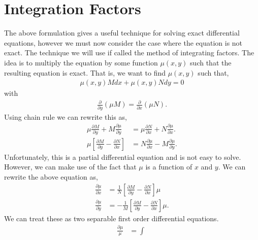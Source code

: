 \section{Integration Factors}
\noindent The above formulation gives a useful technique for solving exact differential equations, however we must now consider the case where the equation is not exact.
The technique we will use if called the method of integrating factors.
The idea is to multiply the equation by some function $\mu(x,y)$ such that the resulting equation is exact.
That is, we want to find $\mu(x,y)$ such that,
\begin{align*}
    \mu(x,y)Mdx + \mu(x,y)Ndy = 0
\end{align*}
with
\begin{align*}
    \frac{\partial}{\partial y}(\mu M) = \frac{\partial}{\partial x}(\mu N).
\end{align*}
Using chain rule we can rewrite this as,
\begin{align*}
    \mu \frac{\partial M}{\partial y} + M \frac{\partial \mu}{\partial y} &= \mu \frac{\partial N}{\partial x} + N \frac{\partial \mu}{\partial x}. \\
    \mu[\frac{\partial M}{\partial y} - \frac{\partial N}{\partial x}] &= N \frac{\partial \mu}{\partial x} - M \frac{\partial \mu}{\partial y}.
\end{align*}
Unfortunately, this is a partial differential equation and is not easy to solve.
However, we can make use of the fact that $\mu$ is a function of $x$ and $y$.
We can rewrite the above equation as,
\begin{align*}
    \frac{\partial \mu}{\partial x} &= \frac{1}{N}[\frac{\partial M}{\partial y} - \frac{\partial N}{\partial x}]\mu \\
    \frac{\partial \mu}{\partial y} &= -\frac{1}{M}[\frac{\partial M}{\partial y} - \frac{\partial N}{\partial x}]\mu.
\end{align*}
We can treat these as two separable first order differential equations.
\begin{align*}
    \frac{\partial \mu}{\mu} &= \int \
\end{align*}






